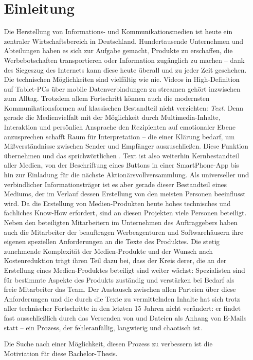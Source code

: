 \section{Einleitung}

Die Herstellung von Informations- und Kommunikationsmedien ist heute ein zentraler Wirtschaftsbereich in Deutschland. Hundertausende Unternehmen und Abteilungen haben es sich zur Aufgabe gemacht, Produkte zu erschaffen, die Werbebotschaften transportieren oder Information zugänglich zu machen -- dank des Siegeszug des Internets kann diese heute überall und zu jeder Zeit geschehen. Die technischen Möglichkeiten sind vielfältig wie nie. Videos in High-Definition auf Tablet-PCs über mobile Datenverbindungen zu streamen gehört inzwischen zum Alltag. Trotzdem allem Fortschritt können auch die modernsten Kommunikationsformen auf klassischen Bestandteil nicht verzichten: \emph{Text}. Denn gerade die Medienvielfalt mit der Möglichkeit durch Multimedia-Inhalte, Interaktion und persönlich Ansprache den Rezipienten auf emotionaler Ebene anzusprechen schafft Raum für Interpretation -- die einer Klärung bedarf, um Mißverständnisse zwischen Sender und Empfänger auszuschließen. Diese Funktion übernehmen  und das sprichwörtlichen . Text ist also weiterhin Kernbestandteil aller Medien, von der Beschriftung eines Buttons in einer SmartPhone-App bis hin zur Einladung für die nächste Aktionärsvollversammlung. Als universeller und verbindlicher Informationsträger ist es aber gerade dieser Bestandteil eines Mediums, der im Verlauf dessen Erstellung von den meisten Personen beeinflusst wird. Da die Erstellung von Medien-Produkten heute hohes technisches und fachliches Know-How erfordert, sind an diesen Projekten viele Personen beteiligt. Neben den beteiligten Mitarbeitern im Unternehmen des Auftraggebers haben auch die Mitarbeiter der beauftragen Werbeagenturen und Softwarehäusern ihre eigenen speziellen Anforderungen an die Texte des Produktes. Die stetig zunehmende Komplexität der Medien-Produkte und der Wunsch nach Kostenreduktion trägt ihren Teil dazu bei, dass der Kreis derer, die an der Erstellung eines Medien-Produktes beteiligt sind weiter wächst: Spezialisten sind für bestimmte Aspekte des Produkts zuständig und verstärken bei Bedarf als freie Mitarbeiter das Team. Der Austausch zwischen allen Parteien über diese Anforderungen und die durch die Texte zu vermittelnden Inhalte hat sich trotz aller technischer Fortschritte in den letzten 15 Jahren nicht verändert: er findet fast ausschließlich durch das Versenden von  und Dateien als Anhang von E-Mails statt -- ein Prozess, der fehleranfällig, langwierig und chaotisch ist. 

\bigskip

Die Suche nach einer Möglichkeit, diesen Prozess zu verbessern ist die Motiviation für diese Bachelor-Thesis. 

\pagebreak